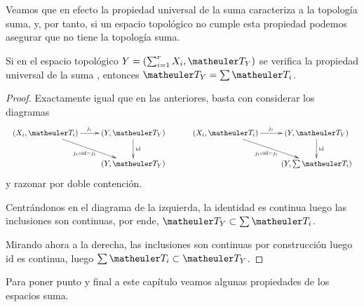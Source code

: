 Veamos que en efecto la propiedad universal de la suma caracteriza a la topología suma, y, por tanto, si un espacio topológico no cumple esta propiedad podemos asegurar que no tiene la topología suma.

\begin{lem}
	Si en el espacio topológico $Y=(\sum_{i=1}^rX_i,\T_Y)$ se verifica la propiedad universal de la suma , entonces $\T_Y=\sum\T_i$.
\end{lem}
\begin{proof}
	Exactamente igual que en las anteriores, basta con considerar los diagramas
	\begin{equation*}
		\begin{array}{cc}
			\xymatrix{
				(X_i,\T_i)\ar[r]^{j_i} \ar[rd]_{j_i\circ\text{id}=j_i}& (Y,\T_Y) \ar[d]^{\text{id}}\\
				& (Y,\T_Y)
			} \qquad&
			\xymatrix{
				(X_i,\T_i)\ar[r]^{j_i} \ar[rd]_{j_i\circ\text{id}=j_i} & (Y,\T_Y) \ar[d]^{\text{id}}\\
				& (Y,\sum\T_i)
			}
		\end{array}
	\end{equation*}
	y razonar por doble contención.
	
	Centrándonos en el diagrama de la izquierda, la identidad es continua luego las inclusiones son continuas, por ende, $\T_Y\subset\sum\T_i$.
	
	Mirando ahora a la derecha, las inclusiones son continuas por construcción luego $\text{id}$ es continua, luego $\sum\T_i\subset \T_Y$.
\end{proof}
Para poner punto y final a este capítulo veamos algunas propiedades de los espacios suma.
